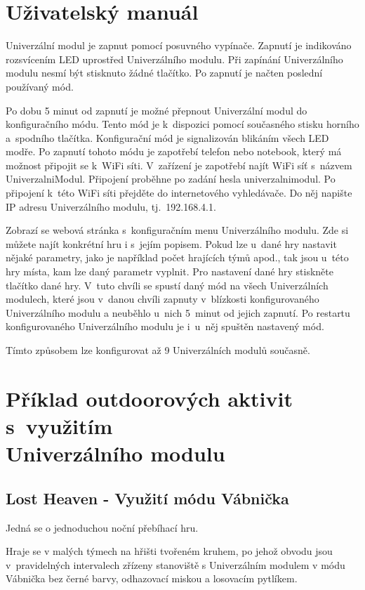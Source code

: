 \chapter{Uživatelský manuál}
Univerzální modul je zapnut pomocí posuvného vypínače. Zapnutí je indikováno rozsvícením LED uprostřed Univerzálního modulu. Při zapínání Univerzálního modulu nesmí být stisknuto žádné tlačítko. Po zapnutí je načten 
poslední používaný mód. 

Po dobu 5 minut od zapnutí je možné přepnout Univerzální modul do konfiguračního módu. Tento mód je k~dispozici pomocí současného stisku horního a~spodního tlačítka. Konfigurační mód je signalizován blikáním všech 
LED modře. Po zapnutí tohoto módu je zapotřebí telefon 
nebo notebook, který má možnost připojit se k~WiFi síti. V~zařízení je zapotřebí najít WiFi síť s~názvem UniverzalniModul. Připojení proběhne po zadání hesla univerzalnimodul. Po připojení k~této WiFi síti přejděte 
do internetového vyhledávače. Do něj napište IP adresu Univerzálního modulu, tj.~192.168.4.1. 

Zobrazí se webová stránka s~konfiguračním menu Univerzálního modulu. Zde si můžete najít konkrétní hru i s~jejím popisem. Pokud lze u~dané hry nastavit nějaké parametry, jako je například počet hrajících týmů apod., tak 
jsou u~této hry místa, kam lze daný parametr vyplnit. Pro nastavení dané hry stiskněte tlačítko dané hry. V~tuto chvíli se spustí daný mód na všech Univerzálních modulech, 
které jsou v~danou chvíli zapnuty v~blízkosti konfigurovaného Univerzálního modulu a neuběhlo u~nich 5~minut od jejich zapnutí. Po restartu konfigurovaného Univerzálního modulu je i~u~něj spuštěn nastavený mód. 

Tímto způsobem lze konfigurovat až 9 Univerzálních modulů současně. 

\chapter{Příklad outdoorových aktivit s~využitím \\Univerzálního modulu}
\section{Lost Heaven - Využití módu Vábnička}
Jedná se o jednoduchou noční přebíhací hru.

Hraje se v malých týmech na hřišti tvořeném kruhem, po jehož obvodu jsou v~pravidelných intervalech zřízeny stanoviště s Univerzálním modulem v módu Vábnička bez černé barvy, odhazovací miskou a losovacím pytlíkem. 

